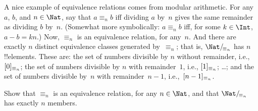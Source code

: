 \documentclass[../../../include/open-logic-section]{subfiles}
\begin{document}
\begin{ex}
A nice example of equivalence relations comes from modular arithmetic.
For any $a$, $b$, and $n \in \Nat$, say that $a \equiv_n b$ iff
dividing $a$ by~$n$ gives the same remainder as dividing $b$ by~$n$.
(Somewhat more symbolically: $a \equiv_n b$ iff, for some $k \in
\Int$, $a - b = kn$.) Now, $\equiv_n$ is an equivalence relation, for
any~$n$. And there are exactly $n$ distinct equivalence classes
generated by~$\equiv_n$; that is, $\equivclass{\Nat}{\equiv_n}$ has
$n$ !!{element}s. These are: the set of numbers divisible by $n$
without remainder, i.e., $[0]_{\equiv_n}$; the set of numbers
divisible by $n$ with remainder~$1$, i.e., $[1]_{\equiv_n}$;
\ldots; and the set of numbers divisible by~$n$ with remainder~$n-1$,
i.e.,~$[n-1]_{\equiv_n}$.
\end{ex}

\begin{prob}
Show that $\equiv_n$ is an equivalence relation, for any $n \in
\Nat$, and that $\equivclass{\Nat}{\equiv_n}$ has exactly $n$ members.
\end{prob}
\end{document}
